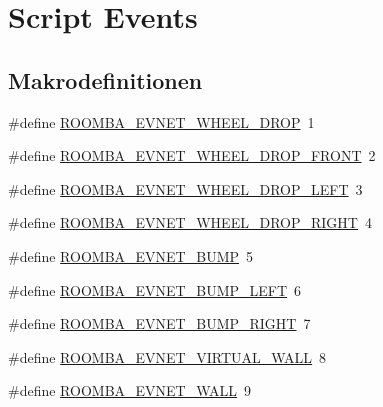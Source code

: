 \hypertarget{group__roomba__commands__script__events}{\section{Script Events}
\label{group__roomba__commands__script__events}
}
\subsection*{Makrodefinitionen}
\begin{DoxyCompactItemize}
\item 
\#define \hyperlink{group__roomba__commands__script__events_ga4eebf2abe2913b98d714bcd93c658c74}{R\-O\-O\-M\-B\-A\-\_\-\-E\-V\-N\-E\-T\-\_\-\-W\-H\-E\-E\-L\-\_\-\-D\-R\-O\-P}~1
\item 
\#define \hyperlink{group__roomba__commands__script__events_gaff8a531948edbc08b3fb449f107466ef}{R\-O\-O\-M\-B\-A\-\_\-\-E\-V\-N\-E\-T\-\_\-\-W\-H\-E\-E\-L\-\_\-\-D\-R\-O\-P\-\_\-\-F\-R\-O\-N\-T}~2
\item 
\#define \hyperlink{group__roomba__commands__script__events_gae7dfae87ada8f7c6aaa98b0ecffc090c}{R\-O\-O\-M\-B\-A\-\_\-\-E\-V\-N\-E\-T\-\_\-\-W\-H\-E\-E\-L\-\_\-\-D\-R\-O\-P\-\_\-\-L\-E\-F\-T}~3
\item 
\#define \hyperlink{group__roomba__commands__script__events_gaf928fb78e7eab93c3540adb82592d518}{R\-O\-O\-M\-B\-A\-\_\-\-E\-V\-N\-E\-T\-\_\-\-W\-H\-E\-E\-L\-\_\-\-D\-R\-O\-P\-\_\-\-R\-I\-G\-H\-T}~4
\item 
\#define \hyperlink{group__roomba__commands__script__events_ga6fed35d5354c1704c50a187b627dfc2b}{R\-O\-O\-M\-B\-A\-\_\-\-E\-V\-N\-E\-T\-\_\-\-B\-U\-M\-P}~5
\item 
\#define \hyperlink{group__roomba__commands__script__events_ga0482e8ee9761dcf0cac034f4f84736cc}{R\-O\-O\-M\-B\-A\-\_\-\-E\-V\-N\-E\-T\-\_\-\-B\-U\-M\-P\-\_\-\-L\-E\-F\-T}~6
\item 
\#define \hyperlink{group__roomba__commands__script__events_ga1bc0c83f630a508bb93fb835319ae5d8}{R\-O\-O\-M\-B\-A\-\_\-\-E\-V\-N\-E\-T\-\_\-\-B\-U\-M\-P\-\_\-\-R\-I\-G\-H\-T}~7
\item 
\#define \hyperlink{group__roomba__commands__script__events_gab5292c9a99dbcb17462690209f352d1f}{R\-O\-O\-M\-B\-A\-\_\-\-E\-V\-N\-E\-T\-\_\-\-V\-I\-R\-T\-U\-A\-L\-\_\-\-W\-A\-L\-L}~8
\item 
\#define \hyperlink{group__roomba__commands__script__events_gafff9142d4afb58ceb092bd3c8728cc17}{R\-O\-O\-M\-B\-A\-\_\-\-E\-V\-N\-E\-T\-\_\-\-W\-A\-L\-L}~9

\end{DoxyCompactItemize}
